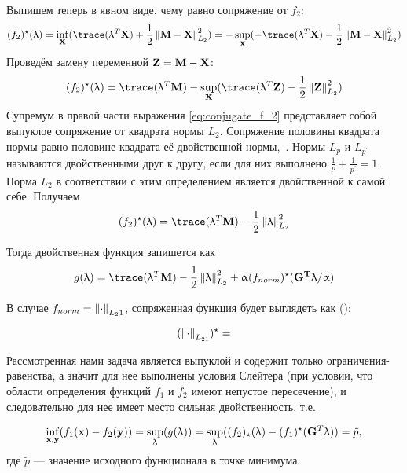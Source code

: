 Выпишем теперь в явном виде, чему равно сопряжение от $f_2$:
\begin{equation*}
    (f_2)^{\star}(\vec{\lambda}) =
    \inf_{\matr{X}}(\trace(\matr{\lambda}^T\matr{X}) + \frac{1}{2}\norm{\matr{M} - \matr{X}}_{L_2}^2) =
    - \sup_{\matr{X}}(- \trace(\matr{\lambda}^T\matr{X}) - \frac{1}{2}\norm{\matr{M} - \matr{X}}_{L_2}^2)
\end{equation*}
Проведём замену переменной $\mathbf{Z} = \mathbf{M} - \mathbf{X}$:
\begin{equation}
    (f_2)^{\star}(\vec{\lambda}) =
    \trace(\matr{\lambda}^T\matr{M}) - \sup_{\matr{X}}(\trace(\matr{\lambda}^T\matr{Z}) - \frac{1}{2}\norm{\matr{Z}}_{L_2}^2)
    \label{eq:conjugate_f_2}
\end{equation}
Супремум в правой части выражения \ref{eq:conjugate_f_2} представляет собой выпуклое сопряжение
от квадрата нормы $L_2$. Сопряжение половины квадрата нормы равно половине квадрата её двойственной нормы,~\cite{Boyd, gramfort_2012}.
Нормы $L_p$ и $L_{p^{\prime}}$ называются двойственными друг к другу, если для них выполнено $\frac{1}{p} + \frac{1}{p^{\prime}} = 1$.
Норма $L_2$ в соответствии с этим определением является двойственной к самой себе. Получаем
\begin{equation}
    (f_2)^{\star}(\vec{\lambda}) =
    \trace(\matr{\lambda}^T\matr{M}) - \frac{1}{2}\norm{\matr{\lambda}}^2_{L_2}
\end{equation}

Тогда двойственная функция запишется как 
\begin{equation}
    g(\vec{\lambda}) =
    \trace(\matr{\lambda}^T\matr{M}) - \frac{1}{2}\norm{\matr{\lambda}}^2_{L_2} + \alpha (f_{norm})^{\star}(\matr{G^T\lambda}/\alpha)
\end{equation}

В случае $f_{norm} = \left\lVert\cdot\right\rVert_{L_21}$, сопряженная функция будет выглядеть как (\cite{gramfort_2012}):

\begin{equation}
    (\left\lVert\cdot\right\rVert_{L_{21}})^{\star} = 
\end{equation}

Рассмотренная нами задача является выпуклой и содержит только
ограничения-равенства, а значит для нее выполнены условия Слейтера (при
условии, что области определения функций $f_1$ и $f_2$ имеют непустое
пересечение), и следовательно для нее имеет место сильная двойственность,
т.е. 

\begin{equation}
    \inf_{\mathbf{x}, \mathbf{y}}(f_1(\mathbf{x}) - f_2(\mathbf{y})) = \sup_{\mathbf{\uplambda}}(g(\mathbf{\uplambda})) =
    \sup_{\mathbf{\uplambda}}((f_2)_{\star}(\mathbf{\uplambda}) - (f_1)^{\star}(\mathbf{G}^T\mathbf{\uplambda})) = \tilde{p},
\end{equation}
где $\tilde{p}$ --- значение исходного функционала в точке минимума.

